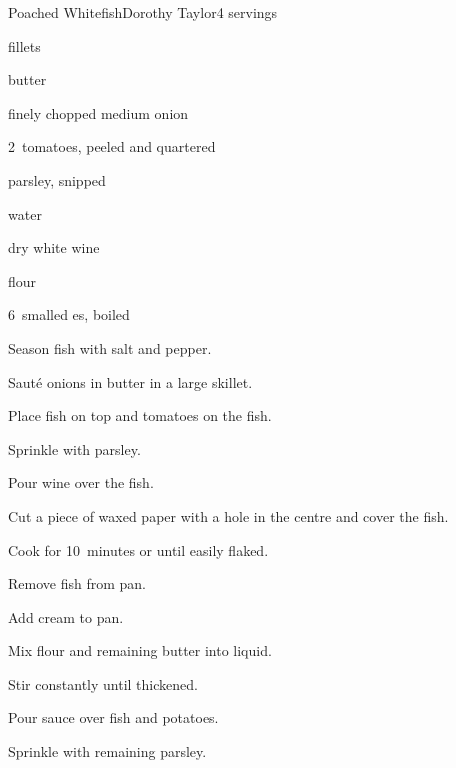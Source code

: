\begin{recipe}{Poached Whitefish}{Dorothy Taylor}{4 servings}

\begin{ingredients}
\item \lbs{1\threequarter}  fillets
\item {}
\item {}
\item {} butter
\item finely chopped medium onion
\item 2~tomatoes, peeled and quartered
\item \C{\quarter} parsley, snipped
\item \C{\third} water
\item \C{\third} dry white wine
\item \C{\third} 
\item {} flour
\item 6~smalled es, boiled
\end{ingredients}

\begin{directions}
\item Season fish with salt and pepper.
\item Saut\'e onions in  butter in a large skillet.
\item Place fish on top and tomatoes on the fish.
\item Sprinkle with  parsley.
\item Pour wine over the fish.
\item Cut a piece of waxed paper with a hole in the centre and  cover the fish.
\item Cook for 10~minutes or until easily flaked.
\item Remove fish from pan.
\item Add cream to pan.
\item Mix flour and remaining butter into liquid.
\item Stir constantly until thickened.
\item Pour sauce over fish and potatoes.
\item Sprinkle with remaining parsley.
\end{directions}

\end{recipe}
